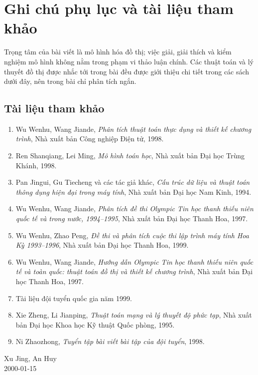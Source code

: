 \documentclass[11pt]{article}
\begin{document}
\appendix

\section{Ghi chú phụ lục và tài liệu tham khảo}

Trọng tâm của bài viết là mô hình hóa đồ thị; việc giải, giải thích và kiểm
nghiệm mô hình không nằm trong phạm vi thảo luận chính. Các thuật toán và lý
thuyết đồ thị được nhắc tới trong bài đều được giới thiệu chi tiết trong các
sách dưới đây, nên trong bài chỉ phân tích ngắn.

\subsection*{Tài liệu tham khảo}

\begin{enumerate}
  \item Wu Wenhu, Wang Jiande, \emph{Phân tích thuật toán thực dụng và thiết
  kế chương trình}, Nhà xuất bản Công nghiệp Điện tử, 1998.
  \item Ren Shanqiang, Lei Ming, \emph{Mô hình toán học}, Nhà xuất bản Đại
  học Trùng Khánh, 1998.
  \item Pan Jingui, Gu Tiecheng và các tác giả khác, \emph{Cấu trúc dữ liệu
  và thuật toán thông dụng hiện đại trong máy tính}, Nhà xuất bản Đại học Nam
  Kinh, 1994.
  \item Wu Wenhu, Wang Jiande, \emph{Phân tích đề thi Olympic Tin học thanh
  thiếu niên quốc tế và trong nước, 1994--1995}, Nhà xuất bản Đại học Thanh
  Hoa, 1997.
  \item Wu Wenhu, Zhao Peng, \emph{Đề thi và phân tích cuộc thi lập trình máy
  tính Hoa Kỳ 1993--1996}, Nhà xuất bản Đại học Thanh Hoa, 1999.
  \item Wu Wenhu, Wang Jiande, \emph{Hướng dẫn Olympic Tin học thanh thiếu
  niên quốc tế và toàn quốc: thuật toán đồ thị và thiết kế chương trình}, Nhà
  xuất bản Đại học Thanh Hoa, 1997.
  \item Tài liệu đội tuyển quốc gia năm 1999.
  \item Xie Zheng, Li Jianping, \emph{Thuật toán mạng và lý thuyết độ phức
  tạp}, Nhà xuất bản Đại học Khoa học Kỹ thuật Quốc phòng, 1995.
  \item Ni Zhaozhong, \emph{Tuyển tập bài viết bài tập của đội tuyển}, 1998.
\end{enumerate}

\begin{flushright}
Xu Jing, An Huy\\
2000-01-15
\end{flushright}
\end{document}
